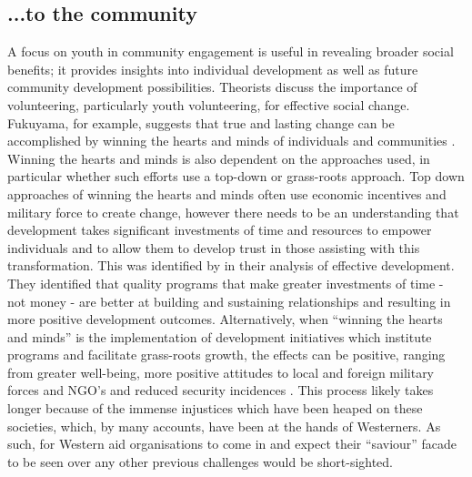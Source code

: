 \subsection{...to the community} 
\label{Benefits}
A focus on youth in community engagement is useful in revealing broader social benefits; it provides insights into individual development as well as future community development possibilities. Theorists discuss the importance of volunteering, particularly youth volunteering, for effective social change. Fukuyama, for example, suggests that true and lasting change can be accomplished by winning the hearts and minds of individuals and communities \citep{Fukuyama2006b}. %
Winning the hearts and minds is also dependent on the approaches used, in particular whether such efforts use a top-down or grass-roots approach. Top down approaches of winning the hearts and minds often use economic incentives and military force to create change, however there needs to be an understanding that development takes significant investments of time and resources to empower individuals and to allow them to develop trust in those assisting with this transformation. This was identified by \citet{Fishstein2012} in their analysis of effective development. They identified that quality programs that make greater investments of time - not money - are better at building and sustaining relationships and resulting in more positive development outcomes. Alternatively, when “winning the hearts and minds” is the implementation of development initiatives which institute programs and facilitate grass-roots growth, the effects can be positive, ranging from greater well-being, more positive attitudes to local and foreign military forces and NGO's and reduced security incidences \citep{Beath2013}. This process likely takes longer because of the immense injustices which have been heaped on these societies, which, by many accounts, have been at the hands of Westerners. As such, for Western aid organisations to come in and expect their “saviour” facade to be seen over any other previous challenges would be short-sighted. 


